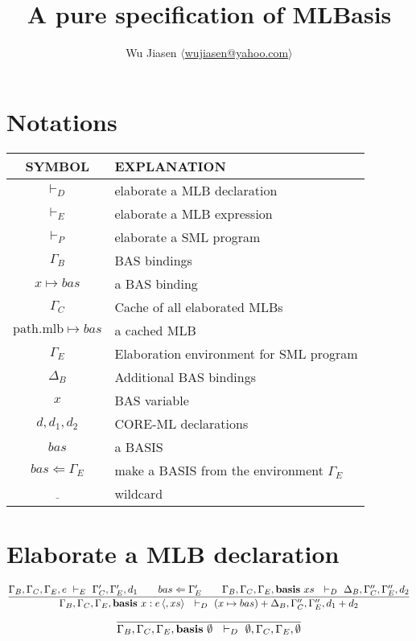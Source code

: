\documentclass[11pt,a4paper]{article}
\newcommand{\keyword}[1]{\textrm{\textbf{#1}}}
\newcommand{\basis}[1]{\keyword{basis}\ #1\ }
\newcommand{\pathmlb}{\textrm{path.mlb}}
\newcommand{\makebasis}[2]{ #1 \Leftarrow #2 }
\newcommand{\Binds}{\Gamma_B}
\newcommand{\BndAD}{\Delta_B}
\newcommand{\Cache}{\Gamma_C}
\newcommand{\Elabo}{\Gamma_E}
\newcommand{\Empty}{\emptyset}
\newcommand{\optional}[1]{\langle #1 \rangle}
\newcommand{\ElabDec}{\ \vdash_D\ }
\newcommand{\ElabExp}{\ \vdash_E\ }
\newcommand{\ElabProg}{\ \vdash_P\ }
\newcommand{\wildcard}{\underline{\phantom{2}}}
\begin{document}
\title {A pure specification of MLBasis}
\author{Wu Jiasen $\langle$\href{mailto:wujiasen@yahoo.com}{wujiasen@yahoo.com}$\rangle$}
\maketitle 

\section{Notations}
\begin{center}
\begin{tabular}{|c|l|}
\hline
SYMBOL      & EXPLANATION   \\
\hline
$\ElabDec$  & elaborate a MLB declaration \\
\hline
$\ElabExp$  & elaborate a MLB expression  \\
\hline
$\ElabProg$ & elaborate a SML program \\
\hline
$\Binds$    & BAS bindings  \\
\hline
$x \mapsto bas$ & a BAS binding \\
\hline
$\Cache$    & Cache of all elaborated MLBs \\
\hline
$\pathmlb \mapsto bas$ & a cached MLB \\
\hline
$\Elabo$    & Elaboration environment for SML program \\
\hline
$\BndAD$    & Additional BAS bindings  \\
\hline
$x$         & BAS variable  \\
\hline      
$d,d_1,d_2$ & CORE-ML declarations \\      
\hline
$ bas $     & a BASIS \\
\hline
$ \makebasis{bas}{\Elabo}$ & make a BASIS from the environment $\Elabo$ \\
\hline
$\wildcard$   & wildcard \\
\hline
\end{tabular}
\end{center}

\section{Elaborate a MLB declaration}
\[
\dfrac{ \Binds,\Cache,\Elabo,e \ElabExp \Cache',\Elabo',d_1 \qquad 
        \makebasis{bas}{\Elabo'} \qquad 
        \Binds,\Cache,\Elabo, \basis{xs} \ElabDec \BndAD, \Cache'', \Elabo'', d_2 }
      { \Binds,\Cache,\Elabo, \basis{x:e\,\optional{,xs}} \ElabDec (x \mapsto bas) + \BndAD, \Cache'', \Elabo'', d_1 + d_2 }
\]
\[
\dfrac{ }
      { \Binds,\Cache,\Elabo, \basis{\Empty} \ElabDec \Empty, \Cache, \Elabo, \Empty}
\]
\end{document}
